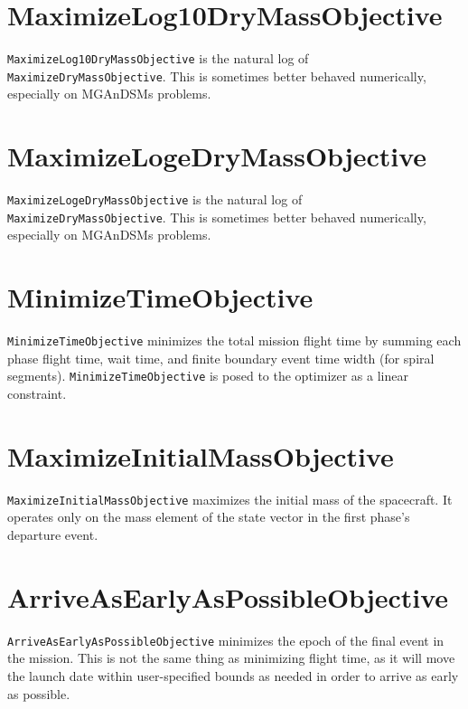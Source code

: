\section{MaximizeLog10DryMassObjective}
\label{sec:MaximizeLog10DryMassObjective}

\texttt{MaximizeLog10DryMassObjective} is the natural log of \texttt{MaximizeDryMassObjective}. This is sometimes better behaved numerically, especially on \ac{MGAnDSMs} problems.

\section{MaximizeLogeDryMassObjective}
\label{sec:MaximizeLogeDryMassObjective}

\texttt{MaximizeLogeDryMassObjective} is the natural log of \texttt{MaximizeDryMassObjective}. This is sometimes better behaved numerically, especially on \ac{MGAnDSMs} problems.

\section{MinimizeTimeObjective}
\label{sec:MinimizeTimeObjective}

\texttt{MinimizeTimeObjective} minimizes the total mission flight time by summing each phase flight time, wait time, and finite boundary event time width (for spiral segments). \texttt{MinimizeTimeObjective} is posed to the optimizer as a linear constraint.

\section{MaximizeInitialMassObjective}
\label{sec:MaximizeInitialMassObjective}

\texttt{MaximizeInitialMassObjective} maximizes the initial mass of the spacecraft. It operates only on the mass element of the state vector in the first phase's departure event.

\section{ArriveAsEarlyAsPossibleObjective}
\label{sec:ArriveAsEarlyAsPossibleObjective}

\texttt{ArriveAsEarlyAsPossibleObjective} minimizes the epoch of the final event in the mission. This is not the same thing as minimizing flight time, as it will move the launch date within user-specified bounds as needed in order to arrive as early as possible.

